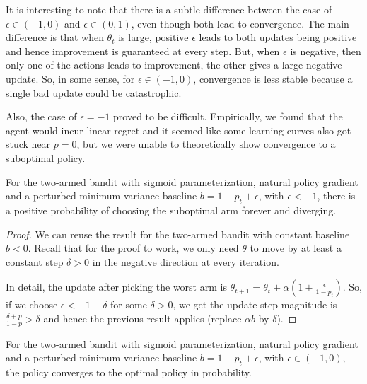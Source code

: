It is interesting to note that there is a subtle difference between the case of $\epsilon \in (-1,0)$ and $\epsilon \in (0,1)$, even though both lead to convergence. The main difference is that when $\theta_t$ is large, positive $\epsilon$ leads to both updates being positive and hence improvement is guaranteed at every step. But, when $\epsilon$ is negative, then only one of the actions leads to improvement, the other gives a large negative update. So, in some sense, for $\epsilon \in (-1,0)$, convergence is less stable because a single bad update could be catastrophic.

Also, the case of $\epsilon=-1$ proved to be difficult. Empirically, we found that the agent would incur linear regret and it seemed like some learning curves also got stuck near $p=0$, but we were unable to theoretically show convergence to a suboptimal policy.
\\





\begin{lemma}
\label{lem:prop_epsilon_inf1}
For the two-armed bandit with sigmoid parameterization, natural policy gradient and a perturbed minimum-variance baseline $b = 1-p_t +\epsilon$, with $\epsilon < -1$, there is a positive probability of choosing the suboptimal arm forever and diverging.
\end{lemma}
\begin{proof}

We can reuse the result for the two-armed bandit with constant baseline $b < 0$.
Recall that for the proof to work, we only need $\theta$ to move by at least a constant step $\delta > 0$ in the negative direction at every iteration.

In detail, the update after picking the worst arm is 
$\theta_{t+1} = \theta_t + \alpha (1 + \frac{\epsilon}{1-p_t})$. So, if we choose $\epsilon < -1 - \delta $ for some $\delta > 0$, we get the update step magnitude is $\frac{\delta + p}{1 - p} > \delta$ and hence the previous result applies (replace $\alpha b$ by $\delta$).
\end{proof}


\begin{lemma}
\label{lem:prop_epsilon_10}
For the two-armed bandit with sigmoid parameterization, natural policy gradient and a perturbed minimum-variance baseline $b = 1-p_t +\epsilon$, with $\epsilon \in (-1,0)$, the policy converges to the optimal policy in probability.
\end{lemma}

